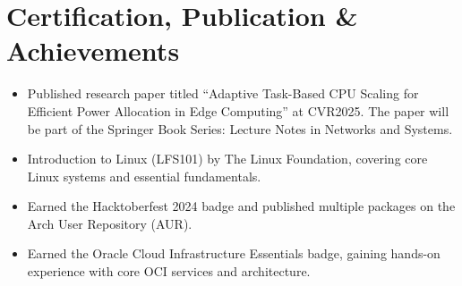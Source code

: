 \documentclass[letterpaper,10pt]{article}
\newcommand{\resumeItem}[1]{\item\small{#1 \vspace{-2pt}}}
\newcommand{\resumeItemListStart}{\begin{itemize}}
\newcommand{\resumeItemListEnd}{\end{itemize}\vspace{-5pt}}
\begin{document}
\section{Certification, Publication \& Achievements}
\resumeItemListStart
  \resumeItem{Published research paper titled “Adaptive Task-Based CPU Scaling for Efficient Power Allocation in Edge Computing” at CVR2025. The paper will be part of the Springer Book Series: Lecture Notes in Networks and Systems.}
  \resumeItem{Introduction to Linux (LFS101) by The Linux Foundation, covering core Linux systems and essential fundamentals.}
  \resumeItem{Earned the Hacktoberfest 2024 badge and published multiple packages on the Arch User Repository (AUR).}
  \resumeItem{Earned the Oracle Cloud Infrastructure Essentials badge, gaining hands-on experience with core OCI services and architecture.}
\resumeItemListEnd
\end{document}
